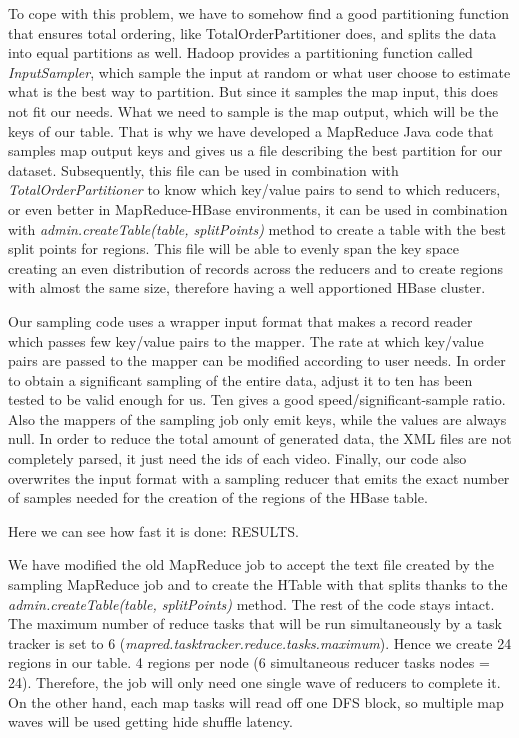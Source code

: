 To cope with this problem, we have to somehow find a good partitioning function that ensures total ordering, like TotalOrderPartitioner does, and splits the data into equal partitions as well. Hadoop provides a partitioning function called \textit{InputSampler}, which sample the input at random or what user choose to estimate what is the best way to partition. But since it samples the map input, this does not fit our needs. What we need to sample is the map output, which will be the keys of our table. That is why we have developed a MapReduce Java code that samples map output keys and gives us a file describing the best partition for our dataset. Subsequently, this file can be used in combination with \textit{TotalOrderPartitioner} to know which key/value pairs to send to which reducers, or even better in MapReduce-HBase environments, it can be used in combination with \textit{admin.createTable(table, splitPoints)} method to create a table with the best split points for regions. This file will be able to evenly span the key space creating an even distribution of records across the reducers and to create regions with almost the same size, therefore having a well apportioned HBase cluster.
\par
Our sampling code uses a wrapper input format that makes a record reader which passes few key/value pairs to the mapper. The rate at which key/value pairs are passed to the mapper can be modified according to user needs. In order to obtain a significant sampling of the entire data, adjust it to ten has been tested to be valid enough for us. Ten gives a good speed/significant-sample ratio. Also the mappers of the sampling job only emit keys, while the values are always null. In order to reduce the total amount of generated data, the XML files are not completely parsed, it just need the ids of each video. Finally, our code also overwrites the input format with a sampling reducer that emits the exact number of samples needed for the creation of the regions of the HBase table. 
\par
Here we can see how fast it is done: RESULTS.
\bigskip

We have modified the old MapReduce job to accept the text file created by the sampling MapReduce job and to create the HTable with that splits thanks to the \textit{admin.createTable(table, splitPoints)} method. The rest of the code stays intact.
\\
The maximum number of reduce tasks that will be run simultaneously by a task tracker is set to 6 (\textit{mapred.tasktracker.reduce.tasks.maximum}). Hence we create 24 regions in our table. 4 regions per node (6 simultaneous reducer tasks  nodes = 24). Therefore, the job will only need one single wave of reducers to complete it. On the other hand, each map tasks will read off one DFS block, so multiple map waves will be used getting hide shuffle latency.

